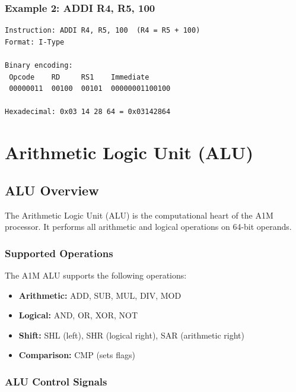 \documentclass[12pt,a4paper,oneside]{book}
\begin{document}
\subsection{Example 2: ADDI R4, R5, 100}

\begin{verbatim}
Instruction: ADDI R4, R5, 100  (R4 = R5 + 100)
Format: I-Type

Binary encoding:
 Opcode    RD     RS1    Immediate
 00000011  00100  00101  00000001100100
 
Hexadecimal: 0x03 14 28 64 = 0x03142864
\end{verbatim}

\chapter{Arithmetic Logic Unit (ALU)}

\section{ALU Overview}

The Arithmetic Logic Unit (ALU) is the computational heart of the A1M processor. It performs all arithmetic and logical operations on 64-bit operands.

\subsection{Supported Operations}

The A1M ALU supports the following operations:

\begin{itemize}
    \item \textbf{Arithmetic:} ADD, SUB, MUL, DIV, MOD
    \item \textbf{Logical:} AND, OR, XOR, NOT
    \item \textbf{Shift:} SHL (left), SHR (logical right), SAR (arithmetic right)
    \item \textbf{Comparison:} CMP (sets flags)
\end{itemize}

\subsection{ALU Control Signals}
\end{document}
